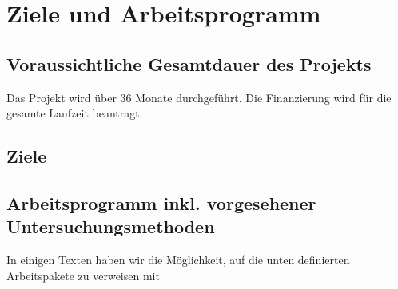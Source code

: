 \section{Ziele und Arbeitsprogramm}

\subsection{Voraussichtliche Gesamtdauer des Projekts}

Das Projekt wird über 36 Monate durchgeführt. Die Finanzierung wird für die gesamte Laufzeit beantragt.

\subsection{Ziele}

\subsection{Arbeitsprogramm inkl. vorgesehener Untersuchungsmethoden}

In einigen Texten haben wir die Möglichkeit, auf die unten definierten Arbeitspakete zu verweisen mit 

